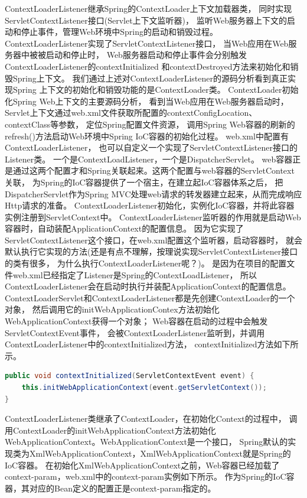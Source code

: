 \documentclass{book}
\begin{document}
ContextLoaderListener继承Spring的ContextLoader上下文加载器类，
同时实现ServletContextListener接口(Servlet上下文监听器)，
监听Web服务器上下文的启动和停止事件，管理Web环境中Spring的启动和销毁过程。
ContextLoaderListener实现了ServletContextListener接口，
当Web应用在Web服务器中被被启动和停止时，
Web服务器启动和停止事件会分别触发ContextLoaderListener的contextInitialized
和contextDestroyed方法来初始化和销毁Spring上下文。
我们通过上述对ContextLoaderListener的源码分析看到真正实现Spring
上下文的初始化和销毁功能的是ContextLoader类。
ContextLoader初始化Spring Web上下文的主要源码分析，
看到当Web应用在Web服务器启动时，
Servlet上下文通过web.xml文件获取所配置的contextConfigLocation、contextClass等参数，
定位Spring配置文件资源，
调用Spring Web容器的刷新的refresh()方法启动Web环境中Spring IoC容器的初始化过程。
web.xml中配置有ContextLoaderListener，
也可以自定义一个实现了ServletContextListener接口的Listener类。
一个是ContextLoadListener，一个是DispatcherServlet。
web容器正是通过这两个配置才和Spring关联起来。这两个配置与web容器的ServletContext关联，
为Spring的IoC容器提供了一个宿主，在建立起IoC容器体系之后，
把DispatcherServlet作为Spring MVC处理web请求的转发器建立起来，从而完成响应Http请求的准备。
ContextLoaderListener初始化，实例化IoC容器，并将此容器实例注册到ServletContext中。
ContextLoaderListener监听器的作用就是启动Web容器时，自动装配ApplicationContext的配置信息。
因为它实现了ServletContextListener这个接口，在web.xml配置这个监听器，启动容器时，
就会默认执行它实现的方法(还是有点不理解，按理说实现ServletContextListener接口的类有很多，
为什么执行ContextLoaderListener呢？)。
是因为在项目的配置文件web.xml已经指定了Listener是Spring的ContextLoadListener，
所以ContextLoaderListener会在启动时执行并装配ApplicationContext的配置信息。
ContextLoaderServlet和ContextLoaderListener都是先创建ContextLoader的一个对象，
然后调用它的initWebApplicationContex方法初始化WebApplicationContext获得一个对象；
Web容器在启动的过程中会触发ServletContextEvent事件，
会被ContextLoaderListener监听到，并调用ContextLoaderListener中的contextInitialized方法，
contextInitialized方法如下所示。

\begin{lstlisting}[language=Java]
public void contextInitialized(ServletContextEvent event) {
	this.initWebApplicationContext(event.getServletContext());
}
\end{lstlisting}

ContextLoaderListener类继承了ContextLoader，在初始化Context的过程中，
调用ContextLoader的initWebApplicationContext方法初始化WebApplicationContext。WebApplicationContext是一个接口，
Spring默认的实现类为XmlWebApplicationContext，XmlWebApplicationContext就是Spring的IoC容器。
在初始化XmlWebApplicationContext之前，Web容器已经加载了context-param，web.xml中的context-param实例如下所示。
作为Spring的IoC容器，其对应的Bean定义的配置正是context-param指定的。
\end{document}
